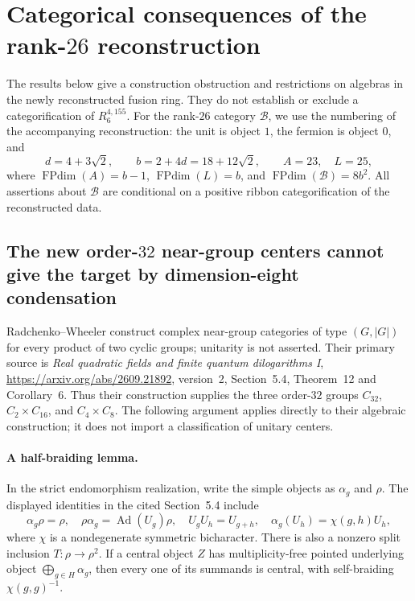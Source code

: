 \section{Categorical consequences of the rank-$26$ reconstruction}
\label{sec:r155-new-categorical}

The results below give a construction obstruction and restrictions on
algebras in the newly reconstructed fusion ring. They do not establish or
exclude a categorification of $R_6^{4,155}$. For the rank-$26$ category
$\mathcal B$, we use the numbering of the accompanying reconstruction:
the unit is object $1$, the fermion is object $0$, and
\[
 d=4+3\sqrt2,\qquad b=2+4d=18+12\sqrt2,\qquad
 A=23,\quad L=25,
\]
where $\operatorname{FPdim}(A)=b-1$, $\operatorname{FPdim}(L)=b$, and
$\operatorname{FPdim}(\mathcal B)=8b^2$. All assertions about
$\mathcal B$ are conditional on a positive ribbon categorification of
the reconstructed data.

\subsection{The new order-$32$ near-group centers cannot give the target
by dimension-eight condensation}

Radchenko--Wheeler construct complex near-group categories of type
$(G,|G|)$ for every product of two cyclic groups; unitarity is not
asserted. Their primary source is
\emph{Real quadratic fields and finite quantum dilogarithms I},
\url{https://arxiv.org/abs/2609.21892}, version~2, Section~5.4,
Theorem~12 and Corollary~6. Thus their construction supplies the three
order-$32$ groups $C_{32}$, $C_2\times C_{16}$, and $C_4\times C_8$.
The following argument applies directly to their algebraic construction;
it does not import a classification of unitary centers.

\paragraph{A half-braiding lemma.}
In the strict endomorphism realization, write the simple objects as
$\alpha_g$ and $\rho$. The displayed identities in the cited Section~5.4
include
\[
 \alpha_g\rho=\rho,\quad
 \rho\alpha_g=\operatorname{Ad}(U_g)\rho,\quad
 U_gU_h=U_{g+h},\quad
 \alpha_g(U_h)=\chi(g,h)U_h,
\]
where $\chi$ is a nondegenerate symmetric bicharacter. There is also a
nonzero split inclusion $T:\rho\longrightarrow\rho^2$.
If a central object $Z$ has multiplicity-free pointed underlying object
$\bigoplus_{g\in H}\alpha_g$, then every one of its summands is central,
with self-braiding $\chi(g,g)^{-1}$.


